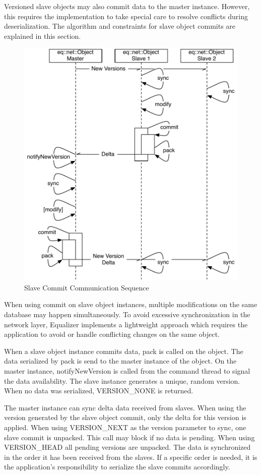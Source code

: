 \documentclass[10pt,a4]{scrartcl}
\begin{document}
Versioned slave objects may also commit data to the master instance. However,
this requires the implementation to take special care to resolve conflicts
during deserialization. The algorithm and constraints for slave object commits
are explained in this section.

\begin{figure}
  \includegraphics[width=.618\textwidth]{images/slaveWrites.pdf}
  {\caption{\label{fSlaveCommit}Slave Commit Communication Sequence}}
\end{figure}
When using \textsf{commit} on slave object instances, multiple modifications on
the same database may happen simultaneously. To avoid excessive synchronization
in the network layer, Equalizer implements a lightweight approach which requires
the application to avoid or handle conflicting changes on the same object.

When a slave object instance commits data, \textsf{pack} is called on the
object. The data serialized by \textsf{pack} is send to the master instance of
the object. On the master instance, \textsf{notifyNewVersion} is called from the
command thread to signal the data availability. The slave instance generates a
unique, random version. When no data was serialized, \textsf{VERSION\_NONE} is
returned.

The master instance can \textsf{sync} delta data received from slaves. When
using the version generated by the slave object commit, only the delta for this
version is applied. When using \textsf{VERSION\_NEXT} as the version parameter
to \textsf{sync}, one slave commit is unpacked. This call may block if no data
is pending. When using \textsf{VERSION\_HEAD} all pending versions are
unpacked. The data is synchronized in the order it has been received from the
slaves. If a specific order is needed, it is the application's responsibility to
serialize the slave commits accordingly.
\end{document}
